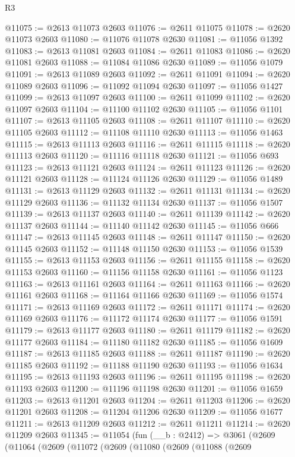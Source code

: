 \begin{lexlean}{R3}
\begin{coremodule}
@11075 := @2613 @11073 @2603
@11076 := @2611 @11075
@11078 := @2620 @11073 @2603
@11080 := @11076 @11078 @2630
@11081 := @11056 @1392
@11083 := @2613 @11081 @2603
@11084 := @2611 @11083
@11086 := @2620 @11081 @2603
@11088 := @11084 @11086 @2630
@11089 := @11056 @1079
@11091 := @2613 @11089 @2603
@11092 := @2611 @11091
@11094 := @2620 @11089 @2603
@11096 := @11092 @11094 @2630
@11097 := @11056 @1427
@11099 := @2613 @11097 @2603
@11100 := @2611 @11099
@11102 := @2620 @11097 @2603
@11104 := @11100 @11102 @2630
@11105 := @11056 @1101
@11107 := @2613 @11105 @2603
@11108 := @2611 @11107
@11110 := @2620 @11105 @2603
@11112 := @11108 @11110 @2630
@11113 := @11056 @1463
@11115 := @2613 @11113 @2603
@11116 := @2611 @11115
@11118 := @2620 @11113 @2603
@11120 := @11116 @11118 @2630
@11121 := @11056 @693
@11123 := @2613 @11121 @2603
@11124 := @2611 @11123
@11126 := @2620 @11121 @2603
@11128 := @11124 @11126 @2630
@11129 := @11056 @1489
@11131 := @2613 @11129 @2603
@11132 := @2611 @11131
@11134 := @2620 @11129 @2603
@11136 := @11132 @11134 @2630
@11137 := @11056 @1507
@11139 := @2613 @11137 @2603
@11140 := @2611 @11139
@11142 := @2620 @11137 @2603
@11144 := @11140 @11142 @2630
@11145 := @11056 @666
@11147 := @2613 @11145 @2603
@11148 := @2611 @11147
@11150 := @2620 @11145 @2603
@11152 := @11148 @11150 @2630
@11153 := @11056 @1539
@11155 := @2613 @11153 @2603
@11156 := @2611 @11155
@11158 := @2620 @11153 @2603
@11160 := @11156 @11158 @2630
@11161 := @11056 @1123
@11163 := @2613 @11161 @2603
@11164 := @2611 @11163
@11166 := @2620 @11161 @2603
@11168 := @11164 @11166 @2630
@11169 := @11056 @1574
@11171 := @2613 @11169 @2603
@11172 := @2611 @11171
@11174 := @2620 @11169 @2603
@11176 := @11172 @11174 @2630
@11177 := @11056 @1591
@11179 := @2613 @11177 @2603
@11180 := @2611 @11179
@11182 := @2620 @11177 @2603
@11184 := @11180 @11182 @2630
@11185 := @11056 @1609
@11187 := @2613 @11185 @2603
@11188 := @2611 @11187
@11190 := @2620 @11185 @2603
@11192 := @11188 @11190 @2630
@11193 := @11056 @1634
@11195 := @2613 @11193 @2603
@11196 := @2611 @11195
@11198 := @2620 @11193 @2603
@11200 := @11196 @11198 @2630
@11201 := @11056 @1659
@11203 := @2613 @11201 @2603
@11204 := @2611 @11203
@11206 := @2620 @11201 @2603
@11208 := @11204 @11206 @2630
@11209 := @11056 @1677
@11211 := @2613 @11209 @2603
@11212 := @2611 @11211
@11214 := @2620 @11209 @2603
@11345 := @11054
    (fun (__b : @2412) =>
    @3061
      (@2609
        (@11064
          (@2609
            (@11072
              (@2609
                (@11080
                  (@2609
                    (@11088
                      (@2609

\end{coremodule}
\end{lexlean}
